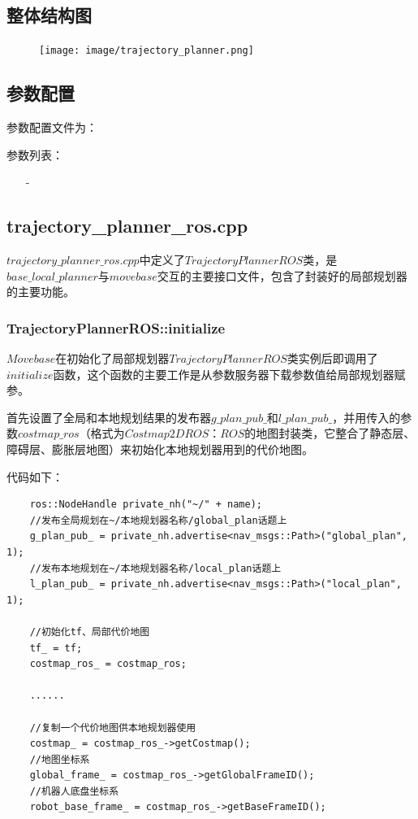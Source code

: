 \documentclass[9pt, oneside]{book}
\begin{document}
\subsection{整体结构图}

\begin{figure}[H]
    \centering
    \texttt{[image: image/trajectory\_planner.png]}
\end{figure}

\subsection{参数配置}

参数配置文件为：

参数列表：

\begin{itemize}
    \item [-] 
\end{itemize}

\subsection{trajectory\_planner\_ros.cpp}

$trajectory\_planner\_ros.cpp$中定义了$TrajectoryPlannerROS$类，是$base\_local\_planner$与$movebase$交互的主要接口文件，包含了封装好的局部规划器的主要功能。


\subsubsection{TrajectoryPlannerROS::initialize}

$Movebase$在初始化了局部规划器$TrajectoryPlannerROS$类实例后即调用了$initialize$函数，这个函数的主要工作是从参数服务器下载参数值给局部规划器赋参。

首先设置了全局和本地规划结果的发布器$g\_plan\_pub\_$和$l\_plan\_pub\_$，并用传入的参数$costmap\_ros$（格式为$Costmap2DROS：ROS$的地图封装类，它整合了静态层、障碍层、膨胀层地图）来初始化本地规划器用到的代价地图。

代码如下：

\small
\begin{verbatim}
    ros::NodeHandle private_nh("~/" + name);
    //发布全局规划在~/本地规划器名称/global_plan话题上
    g_plan_pub_ = private_nh.advertise<nav_msgs::Path>("global_plan", 1);
    //发布本地规划在~/本地规划器名称/local_plan话题上
    l_plan_pub_ = private_nh.advertise<nav_msgs::Path>("local_plan", 1);

    //初始化tf、局部代价地图
    tf_ = tf;
    costmap_ros_ = costmap_ros;

    ......
    
    //复制一个代价地图供本地规划器使用
    costmap_ = costmap_ros_->getCostmap();
    //地图坐标系
    global_frame_ = costmap_ros_->getGlobalFrameID();
    //机器人底盘坐标系
    robot_base_frame_ = costmap_ros_->getBaseFrameID();
\end{verbatim}
\normalsize
\end{document}
